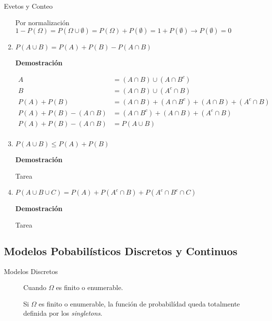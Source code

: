 \documentclass[a4paper]{book}
\begin{document}
\begin{chapter}{Evetos y Conteo}
\begin{enumerate}[{1. }]
        Por normalización $1-P\left(\Omega\right)=P
            \left(\Omega\cup\emptyset\right)=P
            \left(\Omega\right)+P\left(\emptyset\right)=1+P
            \left(\emptyset\right)\to P\left(\emptyset\right)=0$

        \item $P\left(A\cup B\right) = P\left(A\right)+P\left(B\right) -
            P\left(A\cap B\right)$

        \textbf{Demostración}

        \begin{equation*}
        \begin{split}
            A & = \left(A \cap B\right)\cup\left(A \cap B^{c}\right)\\
            B & = \left(A \cap B\right)\cup\left(A^{c} \cap B\right)\\
            P\left(A\right) + P\left(B\right) & = \left(A \cap B\right)+\left(A \cap B^{c}\right) + \left(A \cap B\right) + \left(A^{c} \cap B\right)\\
            P\left(A\right) + P\left(B\right) - \left(A \cap B\right) & = \left(A \cap B^{c}\right) + \left(A \cap B\right) + \left(A^{c} \cap B\right)\\
            P\left(A\right) + P\left(B\right) - \left(A \cap B\right) & = P\left(A\cup B\right)\\
        \end{split}
        \end{equation*}

        \item $P\left(A\cup B\right)\leq P\left(A\right) + P\left(B\right)$

        \textbf{Demostración}

        Tarea

        \item $P\left(A\cup B\cup C\right) =  P\left(A\right) + P\left(A^{c}\cap B\right) + P\left(A^{c}\cap B^{c}\cap C\right)$

        \textbf{Demostración}

        Tarea
    \end{enumerate}

    \subsection{Modelos Pobabilísticos Discretos y Continuos}
    \label{ssec:modelos_pobabilisticos_discretos_y_continuos}

    \begin{description}
        \item[Modelos Discretos] Cuando $\Omega$ es finito o enumerable.
            \begin{obs}
            Si $\Omega$ es finito o enumerable, la función de probabilídad
                queda totalmente definida por los \textit{singletons}.
            \end{obs}

\end{description}
\end{chapter}
\end{document}
